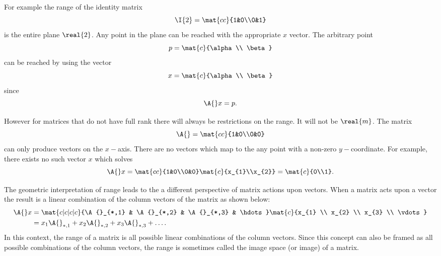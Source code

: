 For example the range of the identity matrix
\begin{equation}
  \I{2}=\mat{cc}{1&0\\0&1}
\end{equation}
is the entire plane $\real{2}$. Any point in the plane can be reached with the appropriate $x$ vector. The arbitrary point 
\begin{equation}
  p = \mat{c}{\alpha \\ \beta}
\end{equation}
can be reached by using the vector
\begin{equation}
  x = \mat{c}{\alpha \\ \beta}
\end{equation}
since 
\begin{equation}
  \A{} x = p.
\end{equation}

However for matrices that do not have full rank there will always be restrictions on the range. It will not be $\real{m}$. The matrix
\begin{equation}
  \A{}=\mat{cc}{1&0\\0&0}
\end{equation}
can only produce vectors on the $x-$axis. There are no vectors which map to the any point with a non-zero $y-$coordinate. For example, there exists no such vector $x$ which solves 
\begin{equation}
  \A{}x=\mat{cc}{1&0\\0&0}\mat{c}{x_{1}\\x_{2}} = \mat{c}{0\\1}.
\end{equation}

The geometric interpretation of range leads to the a different perspective of matrix actions upon vectors. When a matrix acts upon a vector the result is a linear combination of the column vectors of the matrix as shown below:
\begin{equation}
\begin{split}
  \A{}x&=\mat{c|c|c|c}{\A{}_{*,1} & \A{}_{*,2} & \A{}_{*,3} & \hdots}\mat{c}{x_{1} \\ x_{2} \\ x_{3} \\ \vdots} \\
    &= x_{1} \A{}_{*,1} + x_{2} \A{}_{*,2} + x_{3} \A{}_{*,3} + \dots .
\end{split}
\end{equation}
In this context, the range of a matrix is all possible linear combinations of the column vectors. Since this concept can also be framed as all possible combinations of the column vectors, the range is sometimes called the image space (or image) of a matrix.

